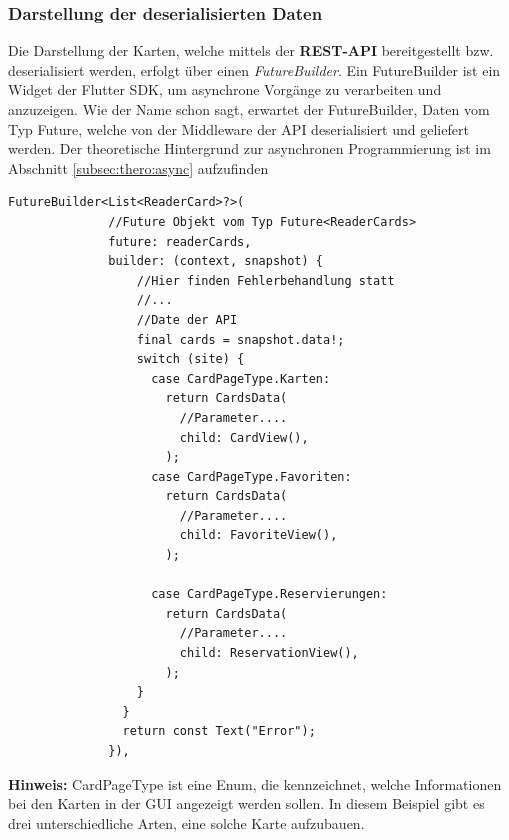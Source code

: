 \subsubsection{Darstellung der deserialisierten Daten }

Die Darstellung der Karten, welche mittels der {\textbf{REST-API}} bereitgestellt bzw. deserialisiert werden, erfolgt über einen {\textit{FutureBuilder}}. Ein FutureBuilder ist ein Widget der Flutter SDK, um asynchrone Vorgänge zu verarbeiten und anzuzeigen. Wie der Name schon sagt, erwartet der FutureBuilder, Daten vom Typ Future, welche von der Middleware der API deserialisiert und geliefert werden. Der theoretische Hintergrund zur asynchronen Programmierung ist im Abschnitt \ref{subsec:thero:async}  aufzufinden

\begin{lstlisting}[caption=Vereinfachte Darstellung eines FutureBuilders,style=goMono]
 FutureBuilder<List<ReaderCard>?>(
              //Future Objekt vom Typ Future<ReaderCards>
              future: readerCards,
              builder: (context, snapshot) {
                  //Hier finden Fehlerbehandlung statt
                  //...
                  //Date der API
                  final cards = snapshot.data!;
                  switch (site) {
                    case CardPageType.Karten:
                      return CardsData(
                        //Parameter....
                        child: CardView(),
                      );
                    case CardPageType.Favoriten:
                      return CardsData(
                        //Parameter....
                        child: FavoriteView(),
                      );

                    case CardPageType.Reservierungen:
                      return CardsData(
                        //Parameter....
                        child: ReservationView(),
                      );
                  }
                }
                return const Text("Error");
              }),
\end{lstlisting}
  {\textbf{Hinweis:}} CardPageType ist eine Enum, die kennzeichnet, welche Informationen bei den Karten in der GUI angezeigt werden sollen. In diesem Beispiel gibt es drei unterschiedliche Arten, eine solche Karte aufzubauen. 
  

